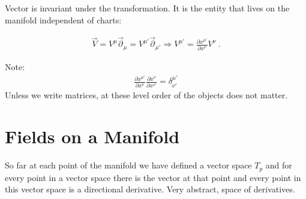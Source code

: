 \documentclass[11pt]{article}
\begin{document}
Vector is invariant under the transformation. It is the entity that lives on the manifold independent of charts:

\begin{align}
\vec{V} = V^\mu \vec{\partial}_\mu = V^{\mu'} \vec{\partial}_{\mu'}    \Rightarrow V^{\mu'} = \frac{\partial x^{\mu'}}{\partial x^\nu}V^\nu    \ .
\end{align}

Note:  
\begin{align}
\frac{\partial x^{\mu'}}{\partial x^\nu} \frac{\partial x^{\nu}}{\partial x^{\nu'}} = \delta^{\mu'}_{\nu'}
 \end{align}
Unless we write matrices, at these level order of the objects does not matter. 


      
\section{Fields on a Manifold}

So far at each point of the manifold we have defined a vector space $T_p$ and for every point in a vector space there is the vector at that point and every point in this vector space is a directional derivative. Very abstract, space of derivatives.
\end{document}
